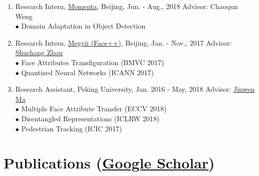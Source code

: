 \documentclass[letterpaper]{article}
\begin{document}
\begin{enumerate}
\item Research Intern, \href{https://www.momenta.ai/en/}{Momenta}, Beijing, Jun. - Aug., 2018 \hfill Advisor: Chaoqun Weng \\
	$\bullet$ Domain Adaptation in Object Detection

\item Research Intern, \href{https://www.faceplusplus.com}{Megvii (Face++)}, Beijing, Jan. - Nov., 2017 \hfill Advisor: \href{https://zsc.github.io/}{Shuchang Zhou}\\
	$\bullet$ Face Attributes Transfiguration (BMVC 2017) \\
	$\bullet$ Quantized Neural Networks (ICANN 2017)

\item Research Assistant, Peking University, Jan. 2016 - May, 2018 \hfill Advisor: \href{https://www.math.pku.edu.cn/teachers/jwma/homepage/}{Jinwen Ma}\\
	$\bullet$ Multiple Face Attribute Transfer (ECCV 2018)\\
	$\bullet$ Disentangled Representations (ICLRW 2018)\\
	$\bullet$ Pedestrian Tracking (ICIC 2017)
	
\end{enumerate}

\fi 


\section*{Publications (\href{https://scholar.google.com/citations?user=Op_tr2IAAAAJ}{Google Scholar})}
\end{document}

